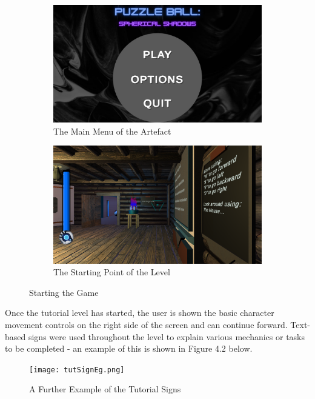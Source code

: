 \begin{figure}[H]
\centering
\begin{subfigure}{0.5\textwidth}
  \centering
  \includegraphics[width=1\linewidth]{Figures/menu.png}
  \caption{The Main Menu of the Artefact}
\end{subfigure}%
\begin{subfigure}{0.5\textwidth}
  \centering
  \includegraphics[width=1\linewidth]{Figures/start.png}
  \caption{The Starting Point of the Level}
\end{subfigure}
\caption{Starting the Game}
\end{figure}

\noindent Once the tutorial level has started, the user is shown the basic character movement controls on the right side of the screen and can continue forward. Text-based signs were used throughout the level to explain various mechanics or tasks to be completed - an example of this is shown in Figure 4.2 below.

\begin{figure}[H]
\centering
\centerline{\texttt{[image: tutSignEg.png]}}
\caption{A Further Example of the Tutorial Signs}
\end{figure}

